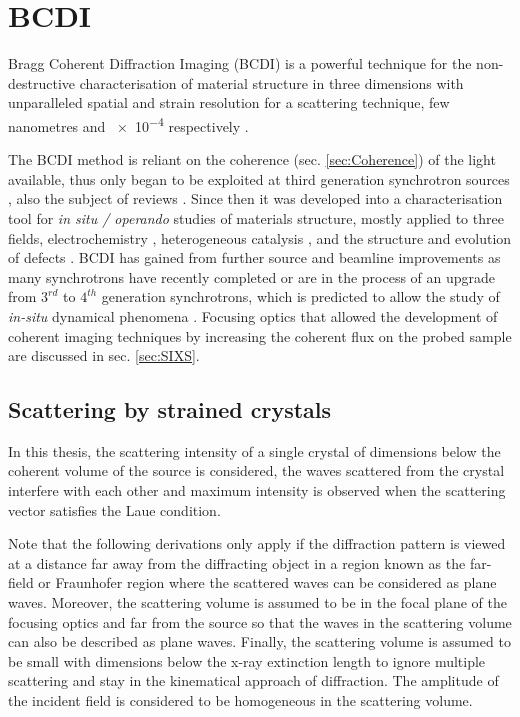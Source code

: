 \section{BCDI} \label{sec:BCDI}

Bragg Coherent Diffraction Imaging (BCDI) \parencite{Robinson2001, Pfeifer2006, Robinson2009} is a powerful technique for the non-destructive characterisation of material structure in three dimensions with unparalleled spatial and strain resolution for a scattering technique, few nanometres \parencite{Labat2015, Cherukara2018a} and \num{e-4} respectively \parencite{Newton2010, Lauraux2020}.

The BCDI method is reliant on the coherence (sec. \ref{sec:Coherence}) of the light available, thus only began to be exploited at third generation synchrotron sources \parencite{Miao1999, Miao2000, Robinson2001, Labat2007, Robinson2009, Vaxelaire2010, Chamard2010, Clark2012, Clark2013, Yang2013, Xiong2014}, also the subject of reviews \parencite{Nugent2010, Miao2015}.
Since then it was developed into a characterisation tool for \textit{in situ / operando} studies of materials structure, mostly applied to three fields, electrochemistry \parencite{Ulvestad2015}, heterogeneous catalysis \parencite{Ulvestad2016}, and the structure and evolution of defects \parencite{Labat2015}.
BCDI has gained from further source and beamline improvements as many synchrotrons have recently completed or are in the process of an upgrade from $3^{rd}$ to $4^{th}$ generation synchrotrons, which is predicted to allow the study of \textit{in-situ} dynamical phenomena \parencite{Lo2018}.
Focusing optics that allowed the development of coherent imaging techniques by increasing the coherent flux on the probed sample are discussed in sec. \ref{sec:SIXS}.

\subsection{Scattering by strained crystals}\label{sec:StrainBCDI}

In this thesis, the scattering intensity of a single crystal of dimensions below the coherent volume of the source is considered, the waves scattered from the crystal interfere with each other and maximum intensity is observed when the scattering vector satisfies the Laue condition.

Note that the following derivations only apply if the diffraction pattern is viewed at a distance far away from the diffracting object in a region known as the far-field or Fraunhofer region \parencite{Willmott} where the scattered waves can be considered as plane waves.
Moreover, the scattering volume is assumed to be in the focal plane of the focusing optics and far from the source so that the waves in the scattering volume can also be described as plane waves.
Finally, the scattering volume is assumed to be small with dimensions below the x-ray extinction length to ignore multiple scattering and stay in the kinematical approach of diffraction.
The amplitude of the incident field is considered to be homogeneous in the scattering volume.

